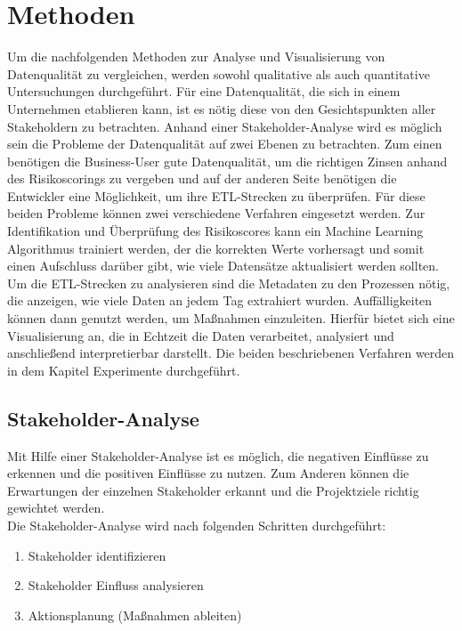 \chapter{Methoden}\label{ch:method}
Um die nachfolgenden Methoden zur Analyse und Visualisierung von Datenqualität zu vergleichen, werden sowohl qualitative als auch quantitative Untersuchungen durchgeführt.
Für eine Datenqualität, die sich in einem Unternehmen etablieren kann, ist es nötig diese von den Gesichtspunkten aller Stakeholdern zu betrachten.
Anhand einer Stakeholder-Analyse wird es möglich sein die Probleme der Datenqualität auf zwei Ebenen zu betrachten. 
Zum einen benötigen die Business-User gute Datenqualität, um die richtigen Zinsen anhand des Risikoscorings zu vergeben und auf der anderen Seite benötigen die Entwickler eine Möglichkeit, um ihre ETL-Strecken zu überprüfen.
Für diese beiden Probleme können zwei verschiedene Verfahren eingesetzt werden.
Zur Identifikation und Überprüfung des Risikoscores kann ein Machine Learning Algorithmus trainiert werden, der die korrekten Werte vorhersagt und somit einen Aufschluss darüber gibt, wie viele Datensätze aktualisiert werden sollten.
Um die ETL-Strecken zu analysieren sind die Metadaten zu den Prozessen nötig, die anzeigen, wie viele Daten an jedem Tag extrahiert wurden. 
Auffälligkeiten können dann genutzt werden, um Maßnahmen einzuleiten.
Hierfür bietet sich eine Visualisierung an, die in Echtzeit die Daten verarbeitet, analysiert und anschließend interpretierbar darstellt.
Die beiden beschriebenen Verfahren werden in dem Kapitel Experimente durchgeführt. 



\section{Stakeholder-Analyse}
\label{sec:Stakeholder-Analyse} 
Mit Hilfe einer Stakeholder-Analyse ist es möglich, die negativen Einflüsse zu erkennen und die positiven Einflüsse zu nutzen.
Zum Anderen können die Erwartungen der einzelnen Stakeholder erkannt und die Projektziele richtig gewichtet werden. \\
Die Stakeholder-Analyse wird nach folgenden Schritten durchgeführt: 

\begin{enumerate}
 \item Stakeholder identifizieren
 \item Stakeholder Einfluss analysieren
 \item Aktionsplanung (Maßnahmen ableiten)
\end{enumerate} \cite{salzsearch}

